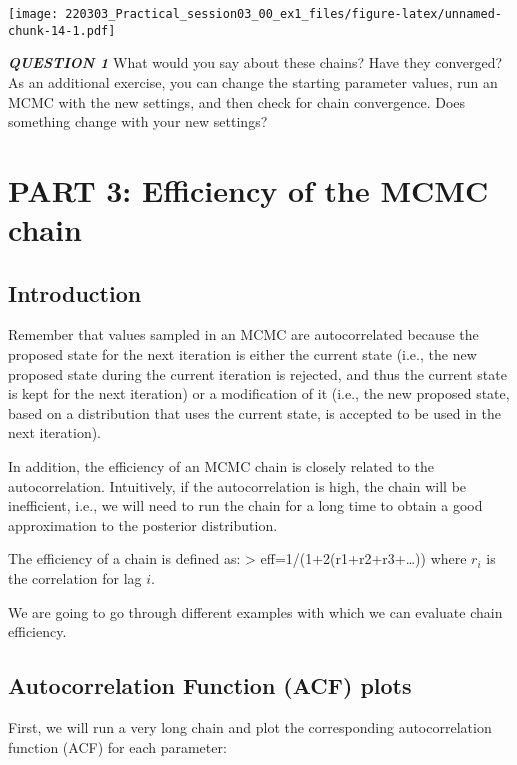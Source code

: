 \documentclass[
]{article}
\begin{document}
\texttt{[image: 220303\_Practical\_session03\_00\_ex1\_files/figure-latex/unnamed-chunk-14-1.pdf]}

\emph{\textbf{QUESTION 1}} What would you say about these chains? Have
they converged? As an additional exercise, you can change the starting
parameter values, run an MCMC with the new settings, and then check for
chain convergence. Does something change with your new settings?

\hypertarget{part-3-efficiency-of-the-mcmc-chain}{%
\section{PART 3: Efficiency of the MCMC
chain}\label{part-3-efficiency-of-the-mcmc-chain}}

\hypertarget{introduction-2}{%
\subsection{Introduction}\label{introduction-2}}

Remember that values sampled in an MCMC are autocorrelated because the
proposed state for the next iteration is either the current state (i.e.,
the new proposed state during the current iteration is rejected, and
thus the current state is kept for the next iteration) or a modification
of it (i.e., the new proposed state, based on a distribution that uses
the current state, is accepted to be used in the next iteration).

In addition, the efficiency of an MCMC chain is closely related to the
autocorrelation. Intuitively, if the autocorrelation is high, the chain
will be inefficient, i.e., we will need to run the chain for a long time
to obtain a good approximation to the posterior distribution.

The efficiency of a chain is defined as: \textgreater{}
eff=1/(1+2(r1+r2+r3+\ldots)) where \(r_{i}\) is the correlation for lag
\(i\).

We are going to go through different examples with which we can evaluate
chain efficiency.

\hypertarget{autocorrelation-function-acf-plots}{%
\subsection{Autocorrelation Function (ACF)
plots}\label{autocorrelation-function-acf-plots}}

First, we will run a very long chain and plot the corresponding
autocorrelation function (ACF) for each parameter:
\end{document}
